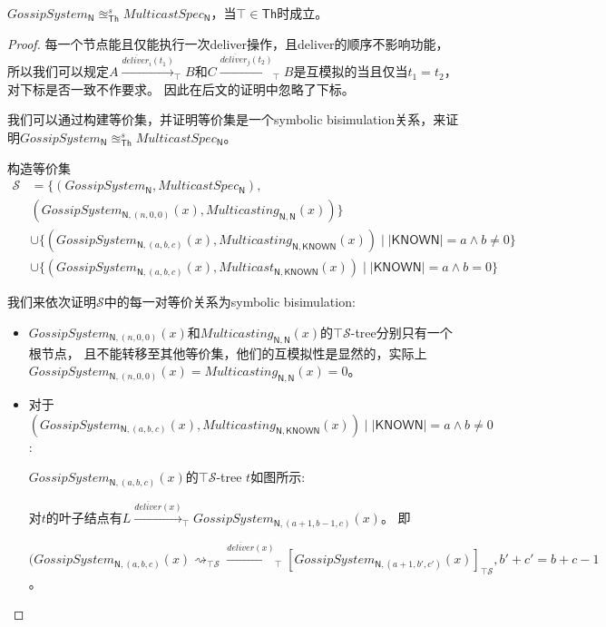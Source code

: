 \begin{theorem}
    $GossipSystem_{\mathsf{N}} \approxeq^s_{\mathsf{Th}} MulticastSpec_{\mathsf{N}}$，当$\top \in \mathsf{Th}$时成立。
\end{theorem}
\begin{proof}
每一个节点能且仅能执行一次deliver操作，且deliver的顺序不影响功能，
所以我们可以规定$A\stackrel{\overline{deliver_i}(t_1)}{\longrightarrow}_{\top} B$和$C\stackrel{\overline{deliver_j}(t_2)}{\longrightarrow}_{\top}B$是互模拟的当且仅当$t_1=t_2$，对下标是否一致不作要求。
因此在后文的证明中忽略了下标。

我们可以通过构建等价集，并证明等价集是一个symbolic bisimulation关系，来证明$GossipSystem_{\mathsf{N}} \approxeq^s_{\mathsf{Th}} MulticastSpec_{\mathsf{N}}$。

构造等价集
\begin{align*}
   \mathcal{S}&=\{(GossipSystem_{\mathsf{N}}, MulticastSpec_{\mathsf{N}}), \\
      &(GossipSystem_{\mathsf{N},(n,0,0)}(x), Multicasting_{\mathsf{N},\mathsf{N}}(x))\}\\
      & \cup \{(GossipSystem_{\mathsf{N},(a,b,c)}(x), Multicasting_{\mathsf{N}, \mathsf{KNOWN}}(x))\mid |\mathsf{KNOWN}| = a \wedge b\neq 0\}\\
      &\cup \{(GossipSystem_{\mathsf{N},(a,b,c)}(x), Multicast_{\mathsf{N}, \mathsf{KNOWN}}(x))\mid |\mathsf{KNOWN}| = a \wedge b= 0\}
\end{align*}

我们来依次证明$\mathcal{S}$中的每一对等价关系为symbolic bisimulation:
\begin{itemize}
    \item {
       $GossipSystem_{\mathsf{N},(n,0,0)}(x)$和$Multicasting_{\mathsf{N},\mathsf{N}}(x)$的$\top \mathcal{S}$-tree分别只有一个根节点，
       且不能转移至其他等价集，他们的互模拟性是显然的，实际上$GossipSystem_{\mathsf{N},(n,0,0)}(x)=Multicasting_{\mathsf{N},\mathsf{N}}(x)=0$。
    }
    \item {
        对于$(GossipSystem_{\mathsf{N},(a,b,c)}(x), Multicasting_{\mathsf{N}, \mathsf{KNOWN}}(x))\mid |\mathsf{KNOWN}| = a \wedge b\neq 0$:

        $GossipSystem_{\mathsf{N},(a,b,c)}(x)$的$\top \mathcal{S}$-tree $t$如图所示:

        对$t$的叶子结点有$L\stackrel{\overline{deliver}(x)}{\longrightarrow}_{\top} GossipSystem_{\mathsf{N},(a+1,b-1,c)}(x)$。
        即
        
        $(GossipSystem_{\mathsf{N},(a,b,c)}(x)\rightsquigarrow_{\top\mathcal{S}}\stackrel{\overline{deliver}(x)}{\longrightarrow}_{\top}[GossipSystem_{\mathsf{N},(a+1,b',c')}(x)]_{\top\mathcal{S}},b'+c'=b+c-1$。

}
\end{itemize}
\end{proof}
